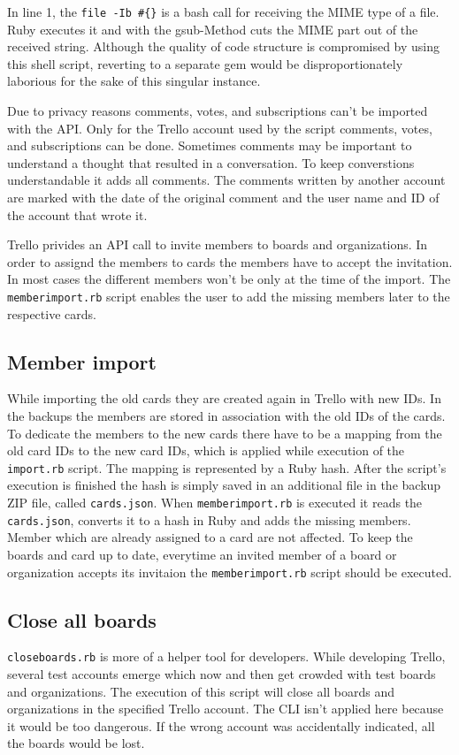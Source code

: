 In line 1, the \texttt{file -Ib \#\{\@filename\}} is a bash call for receiving the MIME type of a file. Ruby executes it and with the gsub-Method cuts the MIME part out of the received string. Although the quality of code structure is compromised by using this shell script, reverting to a separate gem would be disproportionately laborious for the sake of this singular instance. 

Due to privacy reasons comments, votes, and subscriptions can't be imported with the API. Only for the Trello account used by the script comments, votes, and subscriptions can be done. Sometimes comments may be important to understand a thought that resulted in a conversation. To keep converstions understandable it adds all comments. The comments written by another account are marked with the date of the original comment and the user name and ID of the account that wrote it. 

Trello privides an API call to invite members to boards and organizations. In order to assignd the members to cards the members have to accept the invitation. In most cases the different members won't be only at the time of the import. The \texttt{memberimport.rb} script enables the user to add the missing members later to the respective cards.

\subsection{Member import}

While importing the old cards they are created again in Trello with new IDs. In the backups the members are stored in association with the old IDs of the cards. To dedicate the members to the new cards there have to be a mapping from the old card IDs to the new card IDs, which is applied while execution of the \texttt{import.rb} script. The mapping is represented by a Ruby hash. After the script's execution is finished the hash is simply saved in an additional file in the backup ZIP file, called \texttt{cards.json}. When \texttt{memberimport.rb} is executed it reads the \texttt{cards.json}, converts it to a hash in Ruby and adds the missing members. Member which are already assigned to a card are not affected. To keep the boards and card up to date, everytime an invited member of a board or organization accepts its invitaion the \texttt{memberimport.rb} script should be executed.

\subsection{Close all boards}
\texttt{closeboards.rb} is more of a helper tool for developers. While developing Trello, several test accounts emerge which now and then get crowded with test boards and organizations. The execution of this script will close all boards and organizations in the specified Trello account. The CLI isn't applied here because it would be too dangerous. If the wrong account was accidentally indicated, all the boards would be lost.

